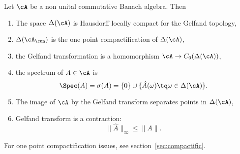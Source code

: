 \begin{theorem}
	Let $\cA$ be a non unital commutative  Banach algebra. Then

	\begin{enumerate}
		\item \label{enuhi} The space $\Delta(\cA)$ is Hausdorff locally compact for the Gelfand topology,
		\item \label{enuhii} $\Delta(\cA_{\cun})$ is the one point compactification of $\Delta(\cA)$,
		\item \label{enuhiii} the Gelfand transformation is a homomorphism $\cA\to C_0(\Delta(\cA))$,
		\item \label{enuhiv} the spectrum of $A\in\cA$ is
		      \[
			      \Spec(A)=\sigma(A)=\{0\}\cup\{\hat A(\omega)\tq\omega\in\Delta(\cA)\}.
		      \]
		\item \label{enuhv} The image of $\cA$ by the Gelfand transform separates points in $\Delta(\cA)$,
		\item \label{enuhvi} Gelfand transform is a contraction:
		      \[
			      \|\hat A\|_{\infty}\leq\|A\|.
		      \]

	\end{enumerate}

\end{theorem}

For one point compactification issues, see section~\ref{sec:compactific}.

